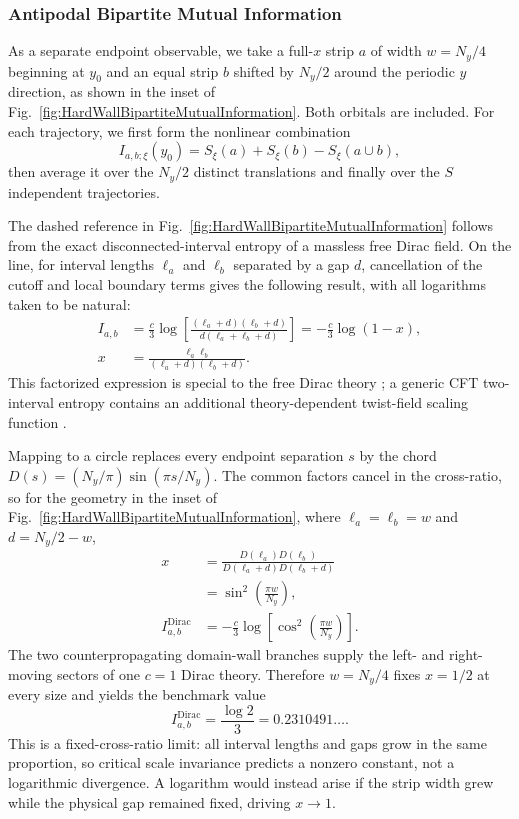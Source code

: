 \documentclass[aps,prb,twocolumn,superscriptaddress,longbibliography,floatfix]{revtex4-2}
\theoremstyle{plain}
\theoremstyle{definition}
\theoremstyle{remark}
\begin{document}
\subsubsection{Antipodal Bipartite Mutual Information}
As a separate endpoint observable, we take a full-$x$ strip $a$ of width
$w=N_y/4$ beginning at $y_0$ and an equal strip $b$ shifted by $N_y/2$ around
the periodic $y$ direction, as shown in the inset of
Fig.~\ref{fig:HardWallBipartiteMutualInformation}.  Both orbitals are included.
For each trajectory, we first form the nonlinear combination
\begin{equation}
 I_{a,b;\xi}(y_0)=S_\xi(a)+S_\xi(b)-S_\xi(a\cup b),
 \label{eq:HardWallTrajectoryMutualInformation}
\end{equation}
then average it over the $N_y/2$ distinct translations and finally over the
$S$ independent trajectories.

The dashed reference in Fig.~\ref{fig:HardWallBipartiteMutualInformation}
follows from the exact disconnected-interval entropy of a massless free Dirac
field.  On the line, for interval lengths $\ell_a$ and $\ell_b$ separated by a
gap $d$, cancellation of the cutoff and local boundary terms gives the
following result, with all logarithms taken to be natural:
\begin{align}
 I_{a,b}
 &=\frac{c}{3}\log\!\left[
   \frac{(\ell_a+d)(\ell_b+d)}{d(\ell_a+\ell_b+d)}\right]
 =-\frac{c}{3}\log(1-x),\nonumber\\
 x&=\frac{\ell_a\ell_b}{(\ell_a+d)(\ell_b+d)}.
 \label{eq:HardWallFreeDiracLineMI}
\end{align}
This factorized expression is special to the free Dirac theory
\cite{CasiniHuerta2009}; a generic CFT two-interval entropy contains an
additional theory-dependent twist-field scaling function
\cite{CalabreseCardyTonni2009}.

Mapping to a circle replaces every endpoint separation $s$ by the chord
$D(s)=(N_y/\pi)\sin(\pi s/N_y)$.  The common factors cancel in the cross-ratio,
so for the geometry in the inset of
Fig.~\ref{fig:HardWallBipartiteMutualInformation}, where
$\ell_a=\ell_b=w$ and $d=N_y/2-w$,
\begin{align}
 x&=\frac{D(\ell_a)D(\ell_b)}
 {D(\ell_a+d)D(\ell_b+d)}\nonumber\\
 &=\sin^2\!\left(\frac{\pi w}{N_y}\right),\nonumber\\
 I_{a,b}^{\mathrm{Dirac}}
 &=-\frac{c}{3}\log\!\left[
 \cos^2\!\left(\frac{\pi w}{N_y}\right)\right].
 \label{eq:HardWallFreeDiracCircleMI}
\end{align}
The two counterpropagating domain-wall branches supply the left- and
right-moving sectors of one $c=1$ Dirac theory.  Therefore $w=N_y/4$ fixes
$x=1/2$ at every size and yields the benchmark value
\begin{equation}
 I_{a,b}^{\mathrm{Dirac}}=\frac{\log 2}{3}=0.2310491\ldots .
 \label{eq:HardWallQuarterStripMI}
\end{equation}
This is a fixed-cross-ratio limit: all interval lengths and gaps grow in the
same proportion, so critical scale invariance predicts a nonzero constant,
not a logarithmic divergence.  A logarithm would instead arise if the strip
width grew while the physical gap remained fixed, driving $x\to1$.
\end{document}
